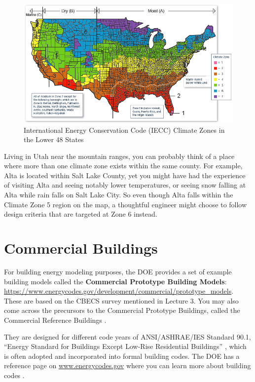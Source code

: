 \documentclass[10pt]{article}
\begin{document}
            \begin{figure}[h]
            \centering
            \includegraphics[width=6.5in]{extras09/climatezones.png}
            \caption{International Energy Conservation Code (IECC) Climate Zones in the Lower 48 States \cite{Baechler2015-me}}
            \label{CZs}
            \end{figure}


Living in Utah near the mountain ranges, you can probably think of a place where more than one climate zone exists within the same county. For example, Alta is located within Salt Lake County, yet you might have had the experience of visiting Alta and seeing notably lower temperatures, or seeing snow falling at Alta while rain falls on Salt Lake City. So even though Alta falls within the Climate Zone 5 region on the map, a thoughtful engineer might choose to follow design criteria that are targeted at Zone 6 instead.

\section{Commercial Buildings}

For building energy modeling purposes, the DOE provides a set of example building models called the \textbf{Commercial Prototype Building Models}:
\url{https://www.energycodes.gov/development/commercial/prototype_models}. These are based on the CBECS survey mentioned in Lecture 3. You may also come across the precursors to the Commercial Prototype Buildings, called the Commercial Reference Buildings \cite{noauthor_undated-hj}.

They are designed for different code years of ANSI/ASHRAE/IES Standard 90.1, ``Energy Standard for Buildings Except Low-Rise Residential Buildings'' \cite{ashrae90.1}, which is often adopted and incorporated into formal building codes. The DOE has a reference page on \url{www.energycodes.gov} where you can learn more about building codes \cite{noauthor_undated-dt}.
\end{document}
